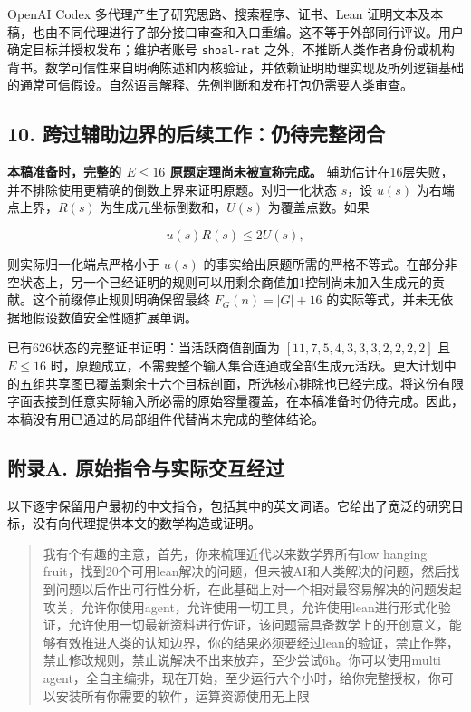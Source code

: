 \documentclass[
  11pt,
]{article}
\begin{document}
OpenAI Codex 多代理产生了研究思路、搜索程序、证书、Lean
证明文本及本稿，也由不同代理进行了部分接口审查和入口重编。这不等于外部同行评议。用户确定目标并授权发布；维护者账号
\texttt{shoal-rat}
之外，不推断人类作者身份或机构背书。数学可信性来自明确陈述和内核验证，并依赖证明助理实现及所列逻辑基础的通常可信假设。自然语言解释、先例判断和发布打包仍需要人类审查。

\hypertarget{ux8de8ux8fc7ux8f85ux52a9ux8fb9ux754cux7684ux540eux7eedux5de5ux4f5cux4ecdux5f85ux5b8cux6574ux95edux5408}{%
\subsection{10.
跨过辅助边界的后续工作：仍待完整闭合}\label{ux8de8ux8fc7ux8f85ux52a9ux8fb9ux754cux7684ux540eux7eedux5de5ux4f5cux4ecdux5f85ux5b8cux6574ux95edux5408}}

\textbf{本稿准备时，完整的 \(E\le16\) 原题定理尚未被宣称完成。}
辅助估计在16层失败，并不排除使用更精确的倒数上界来证明原题。对归一化状态
\(s\)，设 \(u(s)\) 为右端点上界，\(R(s)\) 为生成元坐标倒数和，\(U(s)\)
为覆盖点数。如果

\[
u(s)R(s)\le2U(s),
\]

则实际归一化端点严格小于 \(u(s)\)
的事实给出原题所需的严格不等式。在部分非空状态上，另一个已经证明的规则可以用剩余商值加1控制尚未加入生成元的贡献。这个前缀停止规则明确保留最终
\(F_G(n)=|G|+16\) 的实际等式，并未无依据地假设数值安全性随扩展单调。

已有626状态的完整证书证明：当活跃商值剖面为 \([11,7,5,4,3,3,3,2,2,2,2]\)
且 \(E\le16\)
时，原题成立，不需要整个输入集合连通或全部生成元活跃。更大计划中的五组共享图已覆盖剩余十六个目标剖面，所选核心排除也已经完成。将这份有限字面表接到任意实际输入所必需的原始容量覆盖，在本稿准备时仍待完成。因此，本稿没有用已通过的局部组件代替尚未完成的整体结论。

\hypertarget{ux9644ux5f55a.-ux539fux59cbux6307ux4ee4ux4e0eux5b9eux9645ux4ea4ux4e92ux7ecfux8fc7}{%
\subsection{附录A.
原始指令与实际交互经过}\label{ux9644ux5f55a.-ux539fux59cbux6307ux4ee4ux4e0eux5b9eux9645ux4ea4ux4e92ux7ecfux8fc7}}

以下逐字保留用户最初的中文指令，包括其中的英文词语。它给出了宽泛的研究目标，没有向代理提供本文的数学构造或证明。

\begin{quote}
我有个有趣的主意，首先，你来梳理近代以来数学界所有low hanging
fruit，找到20个可用lean解决的问题，但未被AI和人类解决的问题，然后找到问题以后作出可行性分析，在此基础上对一个相对最容易解决的问题发起攻关，允许你使用agent，允许使用一切工具，允许使用lean进行形式化验证，允许使用一切最新资料进行佐证，该问题需具备数学上的开创意义，能够有效推进人类的认知边界，你的结果必须要经过lean的验证，禁止作弊，禁止修改规则，禁止说解决不出来放弃，至少尝试6h。你可以使用multi
agent，全自主编排，现在开始，至少运行六个小时，给你完整授权，你可以安装所有你需要的软件，运算资源使用无上限
\end{quote}
\end{document}
